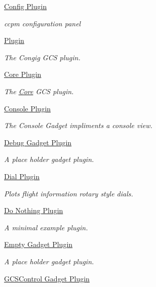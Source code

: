 \begin{DoxyCompactItemize}
\hyperlink{group___config_plugin}{\-Config Plugin}
\begin{DoxyCompactList}\small\item\em ccpm configuration panel \end{DoxyCompactList}\item 
\hyperlink{group___congig}{\-Plugin}
\begin{DoxyCompactList}\small\item\em \-The \-Congig \-G\-C\-S plugin. \end{DoxyCompactList}\item 
\hyperlink{group___core_plugin}{\-Core Plugin}
\begin{DoxyCompactList}\small\item\em \-The \hyperlink{namespace_core}{\-Core} \-G\-C\-S plugin. \end{DoxyCompactList}\item 
\hyperlink{group___console_plugin}{\-Console Plugin}
\begin{DoxyCompactList}\small\item\em \-The \-Console \-Gadget impliments a console view. \end{DoxyCompactList}\item 
\hyperlink{group___debug_gadget_plugin}{\-Debug Gadget Plugin}
\begin{DoxyCompactList}\small\item\em \-A place holder gadget plugin. \end{DoxyCompactList}\item 
\hyperlink{group___dial_plugin}{\-Dial Plugin}
\begin{DoxyCompactList}\small\item\em \-Plots flight information rotary style dials. \end{DoxyCompactList}\item 
\hyperlink{group___do_nothing_plugin}{\-Do Nothing Plugin}
\begin{DoxyCompactList}\small\item\em \-A minimal example plugin. \end{DoxyCompactList}\item 
\hyperlink{group___empty_gadget_plugin}{\-Empty Gadget Plugin}
\begin{DoxyCompactList}\small\item\em \-A place holder gadget plugin. \end{DoxyCompactList}\item 
\hyperlink{group___g_c_s_control_gadget_plugin}{\-G\-C\-S\-Control Gadget Plugin}

\end{DoxyCompactItemize}
